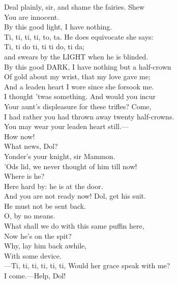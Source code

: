 \documentclass[a4paper,oneside]{memoir}
\begin{document}
\begin{drama*}
Deal plainly, sir, and shame the fairies. Shew\\
You are innocent.\\
\dapperspeaks {} By this good light, I have nothing.\\
\subtlespeaks Ti, ti, ti, ti, to, ta. He does equivocate she says:\\
Ti, ti do ti, ti ti do, ti da;\\
and swears by the LIGHT when he is blinded.\\
\dapperspeaks By this good DARK, I have nothing but a half-crown\\
Of gold about my wrist, that my love gave me;\\
And a leaden heart I wore since she forsook me.\\
\facespeaks I thought 'twas something. And would you incur\\
Your aunt's displeasure for these trifles? Come,\\
I had rather you had thrown away twenty half-crowns.\\
You may wear your leaden heart still.---\\
How now!\\
\subtlespeaks {} What news, Dol?\\
\dolspeaks {} Yonder's your knight, sir Mammon.\\
\facespeaks 'Ods lid, we never thought of him till now!\\
Where is he?\\
\dolspeaks {} Here hard by: he is at the door.\\
\subtlespeaks And you are not ready now! Dol, get his suit.\\
He must not be sent back.\\
\facespeaks {} O, by no means.\\
What shall we do with this same puffin here,\\
Now he's on the spit?\\
\subtlespeaks {} Why, lay him back awhile,\\
With some device.\\
---Ti, ti, ti, ti, ti, ti, Would her grace speak with me?\\
I come.---Help, Dol!\\

\end{drama*}
\end{document}
